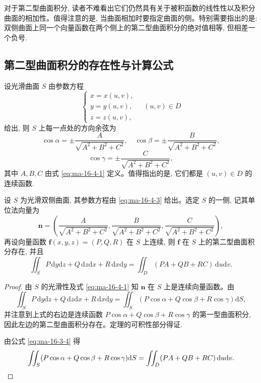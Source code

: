 对于第二型曲面积分, 读者不难看出它们仍然具有关于被积函数的线性性以及积分曲面的相加性。值得注意的是, 当曲面相加时要指定曲面的侧。特别需要指出的是: 双侧曲面上同一个向量函数在两个侧上的第二型曲面积分的绝对值相等, 但相差一个负号.

\subsection{第二型曲面积分的存在性与计算公式}
\label{subsec:ma-16-4-3}

设光滑曲面 $S$ 由参数方程
\begin{equation}
  \begin{cases}
    x=x(u,v),\\
    y=y(u,v),\\
    z=z(u,v),
  \end{cases}\quad (u,v)\in D
  \label{eq:ma-16-4-3}
\end{equation}
给出, 则 $S$ 上每一点处的方向余弦为
\[
  \cos\alpha=\pm\frac{A}{\sqrt{A^2+B^2+C^2}},\quad
  \cos\beta=\pm\frac{B}{\sqrt{A^2+B^2+C^2}},
\]
\[
  \cos\gamma=\pm\frac{C}{\sqrt{A^2+B^2+C^2}},
\]
其中 $A,B,C$ 由式 \eqref{eq:ma-16-4-1} 定义。值得指出的是, 它们都是 $(u,v)\in D$ 的连续函数.

\begin{theorem}\label{theorem:ma-16-4-1}
设 $S$ 为光滑双侧曲面, 其参数方程由 \eqref{eq:ma-16-4-3} 给出。选定 $S$ 的一侧, 记其单位法向量为
\[
  \boldsymbol n=\left(
    \frac{A}{\sqrt{A^2+B^2+C^2}},
    \frac{B}{\sqrt{A^2+B^2+C^2}},
    \frac{C}{\sqrt{A^2+B^2+C^2}}
  \right),
\]
再设向量函数 $\boldsymbol f(x,y,z)=(P,Q,R)$ 在 $S$ 上连续, 则 $\boldsymbol f$ 在 $S$ 上的第二型曲面积分存在, 并且
\[
  \iint_S P\,\mathrm dy\mathrm dz+Q\,\mathrm dz\mathrm dx+R\,\mathrm dx\mathrm dy
  =\iint_D(PA+QB+RC)\,\mathrm du\mathrm dv.
\]
\end{theorem}


\begin{proof}
由 $S$ 的光滑性及式 \eqref{eq:ma-16-4-1} 知 $\boldsymbol n$ 在 $S$ 上是连续向量函数。由
\begin{equation}
  \iint_S P\,\mathrm dy\mathrm dz+Q\,\mathrm dz\mathrm dx+R\,\mathrm dx\mathrm dy
  =\iint_S(P\cos\alpha+Q\cos\beta+R\cos\gamma)\mathrm dS,
  \label{eq:ma-16-4-4}
\end{equation}
并注意到上式的右边是连续函数 $P\cos\alpha+Q\cos\beta+R\cos\gamma$ 的第一型曲面积分, 因此左边的第二型曲面积分存在。定理的可积性部分得证.

由公式 \eqref{eq:ma-16-3-4} 得
\[
  \iint_S(P\cos\alpha+Q\cos\beta+R\cos\gamma)\mathrm dS
  =\iint_D(PA+QB+RC)\,\mathrm du\mathrm dv.
\qedhere
\]
\end{proof}



